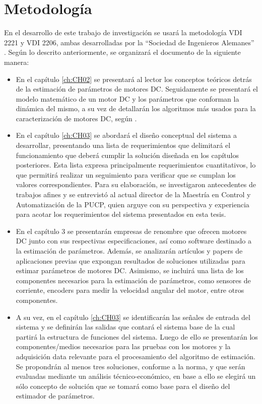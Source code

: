     \section{Metodología}  
        \noindent
        En el desarrollo de este trabajo de investigación se usará la metodología VDI 2221 y VDI 2206, ambas desarrolladas por la ``Sociedad de Ingenieros Alemanes'' \autocite{vdi2206}. 
        Según lo descrito anteriormente, se organizará el documento de la siguiente manera:
        \begin{itemize}
            \item En el capítulo \ref{ch:CH02} se presentará al lector los conceptos teóricos detrás de la estimación de parámetros de motores \ac{DC}. Seguidamente se presentará el modelo matemático de un motor \ac{DC} y los parámetros que conforman la dinámica del mismo, a su vez de detallarán los algoritmos más usados para la caracterización de motores \ac{DC}, según \autocite{Electronics}.
            
            \item En el capítulo \ref{ch:CH03} se abordará el diseño conceptual del sistema a desarrollar, presentando una lista de requerimientos que delimitará el funcionamiento que deberá cumplir la solución diseñada en los capítulos posteriores. Esta lista expresa principalmente requerimientos cuantitativos, lo que permitirá realizar un seguimiento para verificar que se cumplan los valores correspondientes. Para su elaboración, se investigaron antecedentes de trabajos afines y se entrevistó al actual director de la Maestría en Control y Automatización de la \ac{PUCP}, quien arguye con su perspectiva y experiencia para acotar los requerimientos del sistema presentados en esta tesis.
            
            \item En el capítulo 3 se presentarán empresas de renombre que ofrecen motores DC junto con sus respectivas especificaciones, así como software destinado a la estimación de parámetros. Además, se analizarán artículos y papers de aplicaciones previas que expongan resultados de soluciones utilizadas para estimar parámetros de motores DC. Asimismo, se incluirá una lista de los componentes necesarios para la estimación de parámetros, como sensores de corriente, encoders para medir la velocidad angular del motor, entre otros componentes.
            
            \item A su vez, en el capítulo \ref{ch:CH03} se identificarán las señales de entrada del sistema y se definirán las salidas que contará el sistema base de la cual partirá la estructura de funciones del sistema. Luego de ello se presentarán los componentes/medios necesarios para las pruebas con los motores y la adquisición data relevante para el procesamiento del algoritmo de estimación. Se propondrán al menos tres soluciones, conforme a la norma, y que serán evaluadas mediante un análisis técnico-económico, en base a ello se elegirá un sólo concepto de solución que se tomará como base para el diseño del estimador de parámetros. 
            

\end{itemize}
